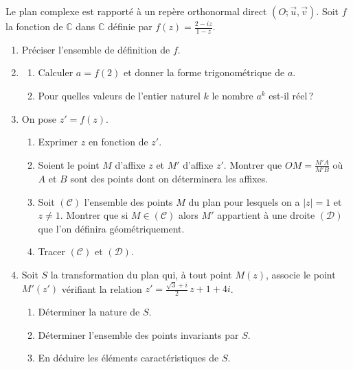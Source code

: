 \begin{exo}
      Le plan complexe est rapporté à un repère orthonormal direct $(O ; \vec{u} , \vec{v})$.
      Soit $f$ la fonction de $\mathbb{C}$ dans $\mathbb{C}$ définie par 
            $f(z) = \frac{2 - i z}{1-z}$.
      \begin{enumerate}
            \item Pr\'eciser l'ensemble de d\'efinition de $f$.
            \item \begin{enumerate}
                        \item Calculer $a = f(2)$ et donner la forme trigonom\'etrique de $a$.
                        \item Pour quelles valeurs de l'entier naturel $k$ le nombre $a^k$ est-il r\'eel\,?
                  \end{enumerate}
            \item On pose $z' = f(z)$.
                  \begin{enumerate}
                        \item Exprimer $z$ en fonction de $z'$.
                        \item Soient le point $M$ d'affixe $z$ et $M'$ d'affixe $z'$.
                              Montrer que $OM = \frac{M'A}{M'B}$
                              o\`u $A$ et $B$ sont des points dont on d\'eterminera les affixes.
                        \item Soit $(\mathscr{C})$ l'ensemble des points $M$ du plan pour lesquels on a 
                              $|z| = 1$ et $z \neq 1$.
                              Montrer que si $M \in (\mathscr{C})$ alors $M'$ appartient \`a une droite $(\mathscr{D})$ que l'on
                              d\'efinira g\'eom\'etriquement.
                        \item Tracer $(\mathscr{C})$ et $(\mathscr{D})$.
                  \end{enumerate}
            \item Soit $S$ la transformation du plan qui, \`a tout point $M(z)$, associe le point $M'(z')$
                  v\'erifiant la relation $z' = \frac{\sqrt{3} + i}{2} \, z + 1 + 4 i $.
                  \begin{enumerate}
                        \item D\'eterminer la nature de $S$.
                        \item D\'eterminer l'ensemble des points invariants par $S$.
                        \item En d\'eduire les \'el\'ements caract\'eristiques de $S$.
                  \end{enumerate}
      \end{enumerate}
\end{exo}





